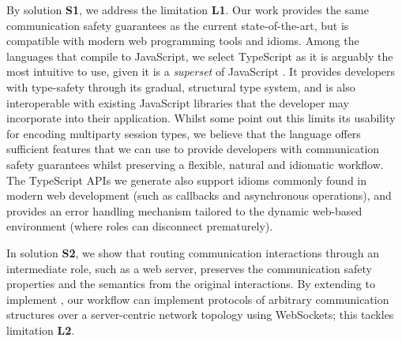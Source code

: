 By solution \textbf{S1}, we address the limitation \textbf{L1}.
Our work provides the same communication safety guarantees
as the current state-of-the-art, but 
is compatible with modern web programming tools and idioms.
Among the languages that compile to JavaScript,
we select TypeScript as it is arguably the most intuitive
to use, given it is a \textit{superset} of JavaScript 
\cite{UnderstandingTypeScript}.
It provides developers
with type-safety through its gradual, structural type system,
and is also interoperable with existing JavaScript libraries
that the developer may incorporate into their application.
Whilst some \cite{MVU2020} point out this limits its usability for
encoding multiparty session types, we believe that the language
offers sufficient features that we can use to provide developers with
communication safety guarantees whilst preserving a flexible, natural
and idiomatic workflow.
The TypeScript APIs we generate also support idioms commonly
found in modern web development (such as callbacks and
asynchronous operations), and provides an error handling
mechanism tailored to the dynamic web-based environment
(where roles can disconnect prematurely).

In solution \textbf{S2},
we show that routing communication interactions through an intermediate
role, such as a web server, preserves the communication
safety properties and the semantics from the original
interactions.
By extending \codegen to implement \newtheory,
our workflow can implement protocols of
arbitrary communication structures over a server-centric
network topology using WebSockets; 
this tackles limitation \textbf{L2}.